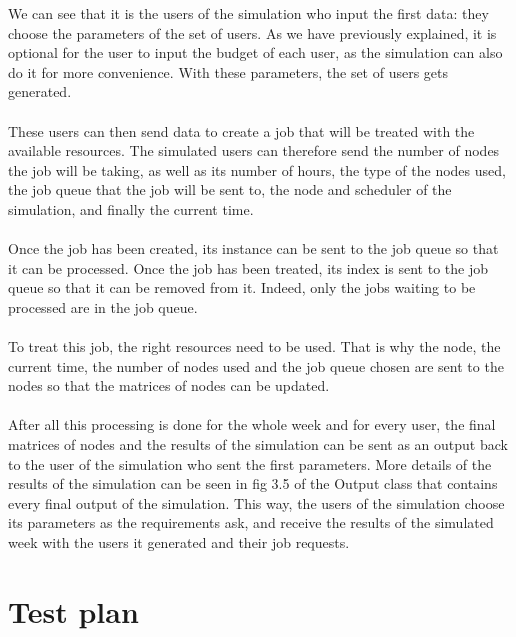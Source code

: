 \documentclass [10 pt, a4 paper]{report}
\begin{document}
\noindent
We can see that it is the users of the simulation who input the first data: they choose the parameters of the set of users. As we have previously explained, it is optional for the user to input the budget of each user, as the simulation can also do it for more convenience. With these parameters, the set of users gets generated. 
\\ \\
These users can then send data to create a job that will be treated with the available resources. The simulated users can therefore send the number of nodes the job will be taking, as well as its number of hours, the type of the nodes used, the job queue that the job will be sent to, the node and scheduler of the simulation, and finally the current time.
\\ \\
Once the job has been created, its instance can be sent to the job queue so that it can be processed. Once the job has been treated, its index is sent to the job queue so that it can be removed from it. Indeed, only the jobs waiting to be processed are in the job queue.
\\ \\
To treat this job, the right resources need to be used. That is why the node, the current time, the number of nodes used and the job queue chosen are sent to the nodes so that the matrices of nodes can be updated.
\\ \\
After all this processing is done for the whole week and for every user, the final matrices of nodes and the results of the simulation can be sent as an output back to the user of the simulation who sent the first parameters. More details of the results of the simulation can be seen in fig 3.5 of the Output class that contains every final output of the simulation. This way, the users of the simulation choose its parameters as the requirements ask, and receive the results of the simulated week with the users it generated and their job requests.








\chapter{Test plan}
\end{document}
